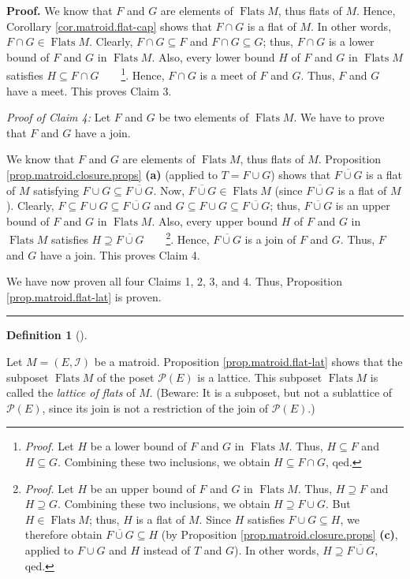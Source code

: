 \documentclass[numbers=enddot,12pt,final,onecolumn,notitlepage]{scrartcl}%
\theoremstyle{definition}
\newtheorem{defi}[theo]{Definition}
\newenvironment{definition}[1][]
{\begin{defi}[#1]\begin{leftbar}}
{\end{leftbar}\end{defi}}
\newenvironment{proof}[1][Proof]{\noindent\textbf{#1.} }{\ \rule{0.5em}{0.5em}}
\begin{document}
\begin{proof}
We know that $F$ and $G$ are elements of $\operatorname*{Flats}M$, thus flats
of $M$. Hence, Corollary \ref{cor.matroid.flat-cap} shows that $F\cap G$ is a
flat of $M$. In other words, $F\cap G\in\operatorname*{Flats}M$. Clearly,
$F\cap G\subseteq F$ and $F\cap G\subseteq G$; thus, $F\cap G$ is a lower
bound of $F$ and $G$ in $\operatorname*{Flats}M$. Also, every lower bound $H$
of $F$ and $G$ in $\operatorname*{Flats}M$ satisfies $H\subseteq F\cap
G$\ \ \ \ \footnote{\textit{Proof.} Let $H$ be a lower bound of $F$ and $G$ in
$\operatorname*{Flats}M$. Thus, $H\subseteq F$ and $H\subseteq G$. Combining
these two inclusions, we obtain $H\subseteq F\cap G$, qed.}. Hence, $F\cap G$
is a meet of $F$ and $G$. Thus, $F$ and $G$ have a meet. This proves Claim 3.

\textit{Proof of Claim 4:} Let $F$ and $G$ be two elements of
$\operatorname*{Flats}M$. We have to prove that $F$ and $G$ have a join.

We know that $F$ and $G$ are elements of $\operatorname*{Flats}M$, thus flats
of $M$. Proposition \ref{prop.matroid.closure.props} \textbf{(a)} (applied to
$T=F\cup G$) shows that $\overline{F\cup G}$ is a flat of $M$ satisfying
$F\cup G\subseteq\overline{F\cup G}$. Now, $\overline{F\cup G}\in
\operatorname*{Flats}M$ (since $\overline{F\cup G}$ is a flat of $M$).
Clearly, $F\subseteq F\cup G\subseteq\overline{F\cup G}$ and $G\subseteq F\cup
G\subseteq\overline{F\cup G}$; thus, $\overline{F\cup G}$ is an upper bound of
$F$ and $G$ in $\operatorname*{Flats}M$. Also, every upper bound $H$ of $F$
and $G$ in $\operatorname*{Flats}M$ satisfies $H\supseteq\overline{F\cup G}%
$\ \ \ \ \footnote{\textit{Proof.} Let $H$ be an upper bound of $F$ and $G$ in
$\operatorname*{Flats}M$. Thus, $H\supseteq F$ and $H\supseteq G$. Combining
these two inclusions, we obtain $H\supseteq F\cup G$. But $H\in
\operatorname*{Flats}M$; thus, $H$ is a flat of $M$. Since $H$ satisfies
$F\cup G\subseteq H$, we therefore obtain $\overline{F\cup G}\subseteq H$ (by
Proposition \ref{prop.matroid.closure.props} \textbf{(c)}, applied to $F\cup
G$ and $H$ instead of $T$ and $G$). In other words, $H\supseteq\overline{F\cup
G}$, qed.}. Hence, $\overline{F\cup G}$ is a join of $F$ and $G$. Thus, $F$
and $G$ have a join. This proves Claim 4.

We have now proven all four Claims 1, 2, 3, and 4. Thus, Proposition
\ref{prop.matroid.flat-lat} is proven.
\end{proof}

\begin{definition}
\label{def.matroid.flat-lat}Let $M=\left(  E,\mathcal{I}\right)  $ be a
matroid. Proposition \ref{prop.matroid.flat-lat} shows that the subposet
$\operatorname*{Flats}M$ of the poset $\mathcal{P}\left(  E\right)  $ is a
lattice. This subposet $\operatorname*{Flats}M$ is called the \emph{lattice of
flats} of $M$. (Beware: It is a subposet, but not a sublattice of
$\mathcal{P}\left(  E\right)  $, since its join is not a restriction of the
join of $\mathcal{P}\left(  E\right)  $.)
\end{definition}
\end{document}

